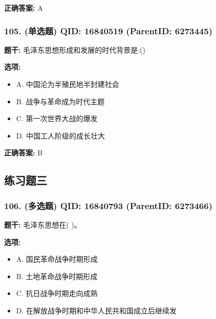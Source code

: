 \documentclass[12pt,UTF8]{ctexart}
\begin{document}
\textbf{正确答案:}
A

\vspace{0.3em}\hrulefill\vspace{0.7em}

\subsubsection*{105. (单选题) \small QID: 16840519 (ParentID: 6273445)}

\textbf{题干:}
毛泽东思想形成和发展的时代背景是:()



\textbf{选项:}
\begin{itemize}[leftmargin=*]

  \item A. 中国沦为半殖民地半封建社会

  \item B. 战争与革命成为时代主题

  \item C. 第一次世界大战的爆发

  \item D. 中国工人阶级的成长壮大

\end{itemize}

\textbf{正确答案:}
B

\vspace{0.3em}\hrulefill\vspace{0.7em}

\subsection*{练习题三}

\subsubsection*{106. (多选题) \small QID: 16840793 (ParentID: 6273466)}

\textbf{题干:}
毛泽东思想在( )。



\textbf{选项:}
\begin{itemize}[leftmargin=*]

  \item A. 国民革命战争时期形成

  \item B. 土地革命战争时期形成

  \item C. 抗日战争时期走向成熟

  \item D. 在解放战争时期和中华人民共和国成立后继续发

\end{itemize}
\end{document}
